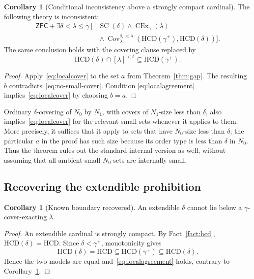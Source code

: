 \documentclass[11pt,letterpaper]{article}
\theoremstyle{definition}
\newtheorem{corollary}[definition]{Corollary}
\newcommand{\ZFC}{\mathsf{ZFC}}
\newcommand{\SC}{\operatorname{SC}}
\newcommand{\CEx}{\operatorname{CEx}}
\newcommand{\HCD}{\mathrm{HCD}}
\newcommand{\Cov}{\operatorname{Cov}}
\begin{document}
\begin{corollary}[Conditional inconsistency above a strongly compact cardinal]
\label{cor:localinconsistency}
The following theory is inconsistent:
\begin{equation}\label{eq:conditionaltheory}
 \begin{split}
 \ZFC+\exists\delta<\lambda\leq\gamma\ \bigl[
 &\SC(\delta)\wedge\CEx_\gamma(\lambda)\\[-2pt]
 &{}\wedge\Cov_\lambda^{\delta,<\lambda}
       (\HCD(\gamma^+),\HCD(\delta))\bigr].
 \end{split}
\end{equation}
The same conclusion holds with the covering clause replaced by
\begin{equation}\label{eq:localagreement}
 \HCD(\delta)\cap[\lambda]^{<\delta}\subseteq\HCD(\gamma^+).
\end{equation}
\end{corollary}

\begin{proof}
Apply~\eqref{eq:localcover} to the set $a$ from Theorem~\ref{thm:gap}. The
resulting $b$ contradicts~\eqref{eq:no-small-cover}. Condition
\eqref{eq:localagreement} implies~\eqref{eq:localcover} by choosing $b=a$.
\end{proof}

Ordinary $\delta$-covering of $N_0$ by $N_1$, with covers of $N_1$-size less
than $\delta$, also implies~\eqref{eq:localcover} for the relevant small sets
whenever it applies to them. More precisely, it suffices that it apply to
sets that have $N_0$-size less than $\delta$; the particular $a$ in the proof
has such size because its order type is less than $\delta$ in $N_0$.
Thus the theorem rules out the standard internal version as well, without
assuming that all ambient-small $N_0$-sets are internally small.

\subsection{Recovering the extendible prohibition}

\begin{corollary}[Known boundary recovered]\label{cor:extendible}
An extendible $\delta$ cannot lie below a $\gamma$-cover-exacting $\lambda$.
\end{corollary}

\begin{proof}
An extendible cardinal is strongly compact. By Fact~\ref{fact:hcd},
$\HCD(\delta)=\HCD$. Since $\delta<\gamma^+$, monotonicity gives
\[
 \HCD(\delta)=\HCD\subseteq\HCD(\gamma^+)
 \subseteq\HCD(\delta).
\]
Hence the two models are equal and~\eqref{eq:localagreement} holds, contrary
to Corollary~\ref{cor:localinconsistency}.
\end{proof}
\end{document}
